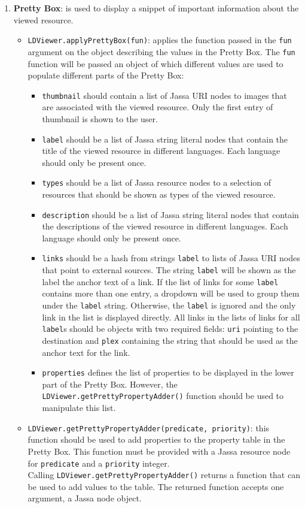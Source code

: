 \documentclass{book}
\begin{document}
\begin{enumerate}
\item \textbf{Pretty Box}: is used to display a snippet of important information about the viewed resource.
\begin{itemize}
\item \texttt{LDViewer.applyPrettyBox(fun)}: applies the function passed in the \texttt{fun} argument on the object describing the values in the Pretty Box.
The \texttt{fun} function will be passed an object of which different values are used to populate different parts of the Pretty Box:
\begin{itemize}
\item \texttt{thumbnail} should contain a list of Jassa URI nodes to images that are associated with the viewed resource.
Only the first entry of thumbnail is shown to the user.
\item \texttt{label} should be a list of Jassa string literal nodes that contain the title of the viewed resource in different languages.
Each language should only be present once.
\item \texttt{types} should be a list of Jassa resource nodes to a selection of resources that should be shown as types of the viewed resource.
\item \texttt{description} should be a list of Jassa string literal nodes that contain the descriptions of the viewed resource in different languages.
Each language should only be present once.
\item \texttt{links} should be a hash from strings \texttt{label} to lists of Jassa URI nodes that point to external sources. The string \texttt{label} will be shown as the label the anchor text of a link. If the list of links for some \texttt{label} contains more than one entry, a dropdown will be used to group them under the \texttt{label} string. Otherwise, the \texttt{label} is ignored and the only link in the list is displayed directly.
All links in the lists of links for all \texttt{label}s should be objects with two required fields: \texttt{uri} pointing to the destination and \texttt{plex} containing the string that should be used as the anchor text for the link.
\item \texttt{properties} defines the list of properties to be displayed in the lower part of the Pretty Box. However, the \texttt{LDViewer.getPrettyPropertyAdder()} function should be used to manipulate this list.
\end{itemize}

\item \texttt{LDViewer.getPrettyPropertyAdder(predicate, priority)}: this function should be used to add properties to the property table in the Pretty Box.
This function must be provided with a Jassa resource node for \texttt{predicate} and a \texttt{priority} integer.\\
Calling \texttt{LDViewer.getPrettyPropertyAdder()} returns a function that can be used to add values to the table. The returned function accepts one argument, a Jassa node object.
\end{itemize}


\end{enumerate}
\end{document}

